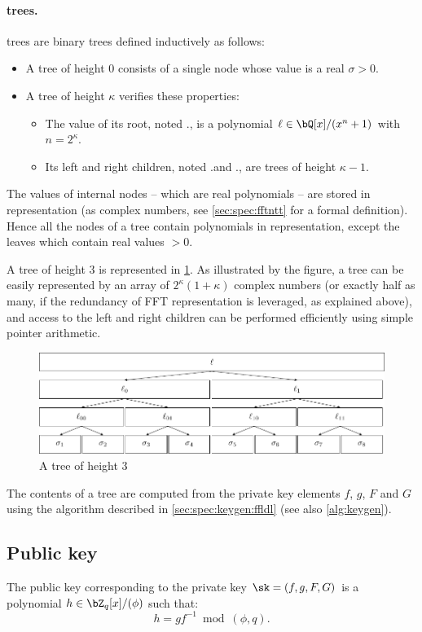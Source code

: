 \paragraph{\falcon trees.} \falcon trees are binary trees defined inductively as follows:
\begin{itemize}
 \item A \falcon tree \tree of height $0$ consists of a single node whose value is a real $\sigma > 0$.
 \item A \falcon tree \tree of height $\kappa$ verifies these properties:
 \begin{itemize}
  \item The value of its root, noted \tree.\data, is a polynomial $\ell \in \bQ[x]/(x^n+1)$ with $n = 2^\kappa$.
  \item Its left and right children, noted \tree.\lchild and \tree.\rchild, are \falcon trees of height $\kappa-1$.
 \end{itemize}
\end{itemize}
 The values of internal nodes -- which are real polynomials -- are stored in \fft representation (\ie as complex numbers, see \cref{sec:spec:fftntt} for a formal definition). Hence all the nodes of a \falcon tree contain polynomials in \fft representation, except the leaves which contain real values $>0$.

 A \falcon tree of height $3$ is represented in \cref{fig:falcontree}. As illustrated by the figure, a \falcon tree can be easily represented by an array of $2^\kappa (1 + \kappa)$ complex numbers (or exactly half as many, if the redundancy of FFT representation is leveraged, as explained above), and access to the left and right children can be performed efficiently using simple pointer arithmetic.
\begin{figure}%
\centering
\includegraphics[width=\textwidth]{tikz/FalconTree}
\caption{A \falcon tree of height $3$}\label{fig:falcontree}
\end{figure}

The contents of a \falcon tree \tree are computed from the private key
elements $f$, $g$, $F$ and $G$ using the algorithm described in
\cref{sec:spec:keygen:ffldl} (see also \cref{alg:keygen}).

\subsection{Public key}

The \falcon public key \pk corresponding to the private key $\sk =
(f,g,F,G)$ is a polynomial $h \in \bZ_q[x]/(\phi)$ such that:
 \begin{equation}
  h = gf^{-1} \bmod (\phi,q).
 \end{equation}
